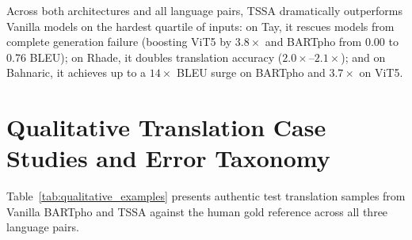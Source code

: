 \documentclass[11pt]{article}
\begin{document}
Across both architectures and all language pairs, TSSA dramatically outperforms Vanilla models on the hardest quartile of inputs: on Tay, it rescues models from complete generation failure (boosting ViT5 by $3.8\times$ and BARTpho from 0.00 to 0.76 BLEU); on Rhade, it doubles translation accuracy ($2.0\times$--$2.1\times$); and on Bahnaric, it achieves up to a $14\times$ BLEU surge on BARTpho and $3.7\times$ on ViT5.

\section{Qualitative Translation Case Studies and Error Taxonomy}
\label{sec:appendix_qualitative}

Table~\ref{tab:qualitative_examples} presents authentic test translation samples from Vanilla BARTpho and TSSA against the human gold reference across all three language pairs.
\end{document}
